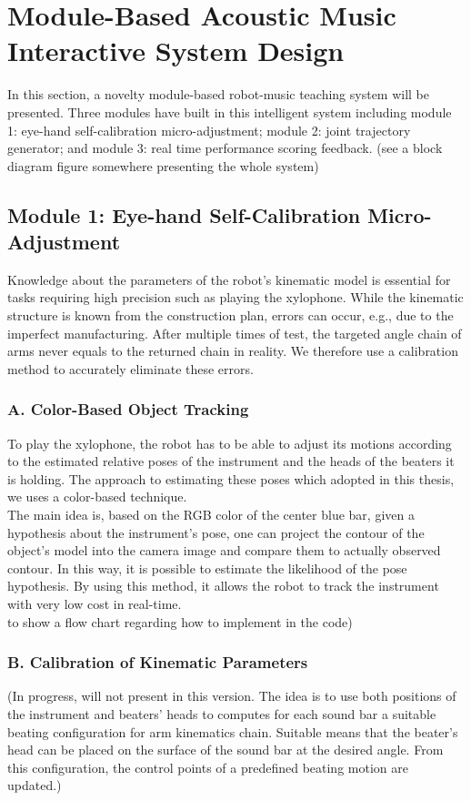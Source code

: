 \section{Module-Based Acoustic Music Interactive System Design}
In this section, a novelty module-based robot-music teaching system will be presented. 
Three modules have built in this intelligent system including module 1: eye-hand 
self-calibration micro-adjustment; module 2: joint trajectory generator; and 
module 3: real time performance scoring feedback. (see a block diagram figure 
somewhere presenting the whole system)

\subsection{Module 1: Eye-hand Self-Calibration Micro-Adjustment}
Knowledge about the parameters of the robot's kinematic model is essential for 
tasks requiring high precision such as playing the xylophone. While the kinematic 
structure is known from the construction plan, errors can occur, e.g., due to the 
imperfect manufacturing. After multiple times of test, the targeted angle chain 
of arms never equals to the returned chain in reality. We therefore use a 
calibration method to accurately eliminate these errors. 

\subsubsection{A. Color-Based Object Tracking}
To play the xylophone, the robot has to be able to adjust its motions according to
the estimated relative poses of the instrument and the heads of the beaters it is 
holding. The approach to estimating these poses which adopted in this thesis, we 
uses a color-based technique.\\
The main idea is, based on the RGB color of the center blue bar, given a hypothesis 
about the instrument's pose, one can project the contour of the object's model into the 
camera image and compare them to actually observed contour. In this way, it is possible 
to estimate the likelihood of the pose hypothesis. By using this method, it allows
the robot to track the instrument with very low cost in real-time.\\
to show a flow chart regarding how to implement in the code)

\subsubsection{B. Calibration of Kinematic Parameters}
(In progress, will not present in this version. The idea is to use both positions 
of the instrument and beaters' heads to computes for each sound bar a suitable 
beating configuration for arm kinematics chain. Suitable means that the beater's 
head can be placed on the surface of the sound bar at the desired angle. From 
this configuration, the control points of a predefined beating motion are updated.)\\ 

